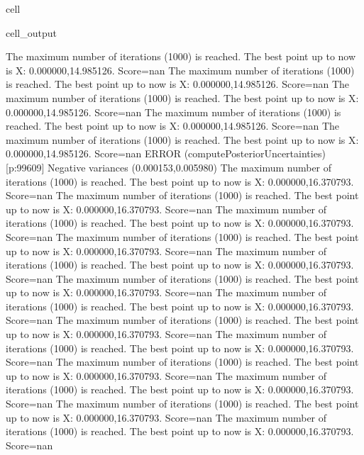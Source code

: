 \documentclass[letterpaper,10pt,english]{jupyterBook}
\begin{document}
\begin{sphinxuseclass}{cell}
\begin{sphinxVerbatimOutput}
\begin{sphinxuseclass}{cell_output}
\begin{sphinxVerbatim}[commandchars=\\\{\}]
The maximum number of iterations (1000) is reached. The best point up to now is X: \PYGZob{}0.000000,14.985126\PYGZcb{}. Score=\PYGZhy{}nan
The maximum number of iterations (1000) is reached. The best point up to now is X: \PYGZob{}0.000000,14.985126\PYGZcb{}. Score=\PYGZhy{}nan
The maximum number of iterations (1000) is reached. The best point up to now is X: \PYGZob{}0.000000,14.985126\PYGZcb{}. Score=\PYGZhy{}nan
The maximum number of iterations (1000) is reached. The best point up to now is X: \PYGZob{}0.000000,14.985126\PYGZcb{}. Score=\PYGZhy{}nan
The maximum number of iterations (1000) is reached. The best point up to now is X: \PYGZob{}0.000000,14.985126\PYGZcb{}. Score=\PYGZhy{}nan
ERROR (compute\PYGZus{}Posterior\PYGZus{}Uncertainties) [p:99609] Negative variances (\PYGZhy{}0.000153,0.005980)
The maximum number of iterations (1000) is reached. The best point up to now is X: \PYGZob{}0.000000,16.370793\PYGZcb{}. Score=\PYGZhy{}nan
The maximum number of iterations (1000) is reached. The best point up to now is X: \PYGZob{}0.000000,16.370793\PYGZcb{}. Score=\PYGZhy{}nan
The maximum number of iterations (1000) is reached. The best point up to now is X: \PYGZob{}0.000000,16.370793\PYGZcb{}. Score=\PYGZhy{}nan
The maximum number of iterations (1000) is reached. The best point up to now is X: \PYGZob{}0.000000,16.370793\PYGZcb{}. Score=\PYGZhy{}nan
The maximum number of iterations (1000) is reached. The best point up to now is X: \PYGZob{}0.000000,16.370793\PYGZcb{}. Score=\PYGZhy{}nan
The maximum number of iterations (1000) is reached. The best point up to now is X: \PYGZob{}0.000000,16.370793\PYGZcb{}. Score=\PYGZhy{}nan
The maximum number of iterations (1000) is reached. The best point up to now is X: \PYGZob{}0.000000,16.370793\PYGZcb{}. Score=\PYGZhy{}nan
The maximum number of iterations (1000) is reached. The best point up to now is X: \PYGZob{}0.000000,16.370793\PYGZcb{}. Score=\PYGZhy{}nan
The maximum number of iterations (1000) is reached. The best point up to now is X: \PYGZob{}0.000000,16.370793\PYGZcb{}. Score=\PYGZhy{}nan
The maximum number of iterations (1000) is reached. The best point up to now is X: \PYGZob{}0.000000,16.370793\PYGZcb{}. Score=\PYGZhy{}nan
The maximum number of iterations (1000) is reached. The best point up to now is X: \PYGZob{}0.000000,16.370793\PYGZcb{}. Score=\PYGZhy{}nan
The maximum number of iterations (1000) is reached. The best point up to now is X: \PYGZob{}0.000000,16.370793\PYGZcb{}. Score=\PYGZhy{}nan
The maximum number of iterations (1000) is reached. The best point up to now is X: \PYGZob{}0.000000,16.370793\PYGZcb{}. Score=\PYGZhy{}nan

\end{sphinxVerbatim}
\end{sphinxuseclass}
\end{sphinxVerbatimOutput}
\end{sphinxuseclass}
\end{document}
